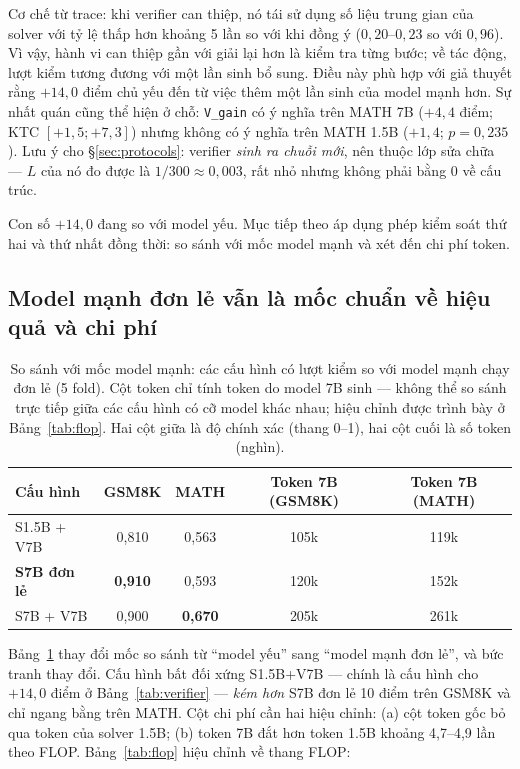 Cơ chế từ trace: khi verifier can thiệp, nó tái sử dụng số liệu trung gian của solver với tỷ lệ thấp hơn khoảng 5 lần so với khi đồng ý ($0{,}20$--$0{,}23$ so với $0{,}96$). Vì vậy, hành vi can thiệp gần với giải lại hơn là kiểm tra từng bước; về tác động, lượt kiểm tương đương với một lần sinh bổ sung. Điều này phù hợp với giả thuyết rằng $+14{,}0$ điểm chủ yếu đến từ việc thêm một lần sinh của model mạnh hơn. Sự nhất quán cũng thể hiện ở chỗ: \texttt{V\_gain} có ý nghĩa trên MATH 7B ($+4{,}4$ điểm; KTC $[+1{,}5;+7{,}3]$) nhưng không có ý nghĩa trên MATH 1.5B ($+1{,}4$; $p=0{,}235$). Lưu ý cho \S\ref{sec:protocols}: verifier \emph{sinh ra chuỗi mới}, nên thuộc lớp sửa chữa --- $L$ của nó đo được là $1/300 \approx 0{,}003$, rất nhỏ nhưng không phải bằng 0 về cấu trúc.

Con số $+14{,}0$ đang so với model yếu. Mục tiếp theo áp dụng phép kiểm soát thứ hai và thứ nhất đồng thời: so sánh với mốc model mạnh và xét đến chi phí token.

\subsection{Model mạnh đơn lẻ vẫn là mốc chuẩn về hiệu quả và chi phí}\label{sec:baseline}

\begin{table}[h]\centering\small
\begin{tabular}{@{}l c c c c@{}}
\toprule
Cấu hình & GSM8K & MATH & Token 7B (GSM8K) & Token 7B (MATH)\\
\midrule
S1.5B + V7B & 0,810 & 0,563 & 105k & 119k\\
\textbf{S7B đơn lẻ} & \textbf{0,910} & 0,593 & 120k & 152k\\
S7B + V7B & 0,900 & \textbf{0,670} & 205k & 261k\\
\bottomrule
\end{tabular}
\caption{So sánh với mốc model mạnh: các cấu hình có lượt kiểm so với model mạnh chạy đơn lẻ (5 fold). Cột token chỉ tính token do model 7B sinh --- không thể so sánh trực tiếp giữa các cấu hình có cỡ model khác nhau; hiệu chỉnh được trình bày ở Bảng~\ref{tab:flop}. Hai cột giữa là độ chính xác (thang 0--1), hai cột cuối là số token (nghìn).}
\label{tab:baseline}
\end{table}

Bảng~\ref{tab:baseline} thay đổi mốc so sánh từ ``model yếu'' sang ``model mạnh đơn lẻ'', và bức tranh thay đổi. Cấu hình bất đối xứng S1.5B+V7B --- chính là cấu hình cho $+14{,}0$ điểm ở Bảng~\ref{tab:verifier} --- \emph{kém hơn} S7B đơn lẻ 10 điểm trên GSM8K và chỉ ngang bằng trên MATH. Cột chi phí cần hai hiệu chỉnh: (a) cột token gốc bỏ qua token của solver 1.5B; (b) token 7B đắt hơn token 1.5B khoảng 4,7--4,9 lần theo FLOP. Bảng~\ref{tab:flop} hiệu chỉnh về thang FLOP:

